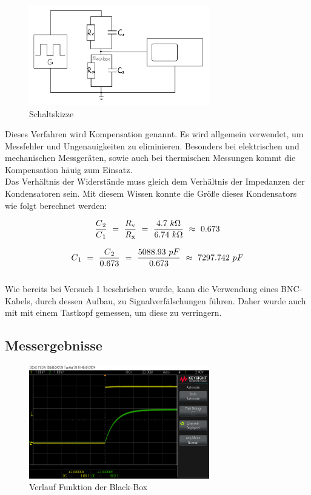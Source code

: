 \documentclass[a4paper,12pt]{article}
\begin{document}
\begin{figure}[H]
    \centering
    \includegraphics[width=0.7\textwidth]{../Quellen/Labor2/SkizzeVerschaltungWiderstandKondensatorVersuch2.jpeg}
\caption{Schaltskizze}
\end{figure}

\noindent Dieses Verfahren wird Kompensation genannt. Es wird allgemein verwendet, um Messfehler und Ungenauigkeiten zu eliminieren. Besonders bei elektrischen und mechanischen Messgeräten, sowie auch bei thermischen Messungen kommt die Kompensation häuig zum Einsatz.\\


\noindent Das Verhältnis der Widerstände muss gleich dem Verhältnis der Impedanzen der Kondensatoren sein. Mit diesem Wissen konnte die Größe dieses Kondensators wie folgt berechnet werden:

\[
\frac{C\textsubscript{2}}{C\textsubscript{1}}~=~\frac{R\textsubscript{v}}{R\textsubscript{x}}~=~\frac{4.7~k\Omega}{6.74~k\Omega}~\approx~0.673\]

\[
C\textsubscript{1}~=~\frac{C\textsubscript{2}}{0.673}~=~\frac{5088.93~pF}{0.673}~\approx~7297.742~pF
\]\\



\noindent Wie bereits bei Versuch 1 beschrieben wurde, kann die Verwendung eines BNC-Kabels, durch dessen Aufbau, zu Signalverfälschungen führen. Daher wurde auch mit mit einem Tastkopf gemessen, um diese zu verringern.


\subsection{Messergebnisse}
\begin{figure}[H]
    \centering
    \includegraphics[width=0.7\textwidth]{../Quellen/Labor2/scope_3.png}
\caption{Verlauf Funktion der Black-Box}
\end{figure}
\end{document}
